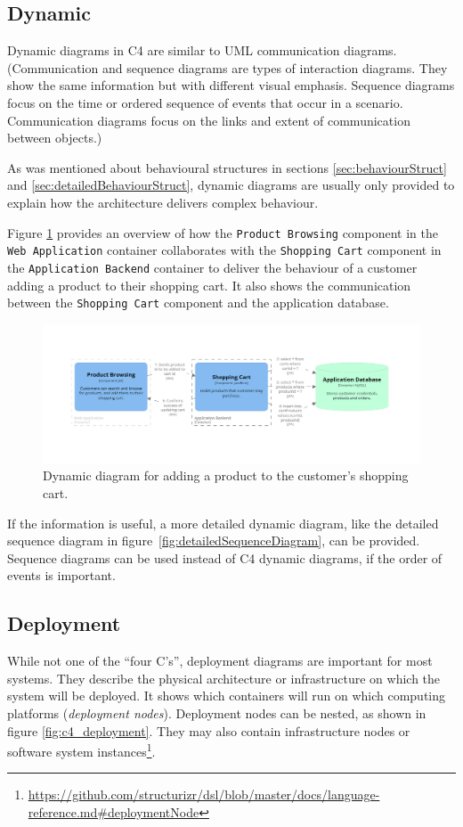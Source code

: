 \subsection{Dynamic}
Dynamic diagrams in C4 are similar to UML communication diagrams.
(Communication and sequence diagrams are types of interaction diagrams.
They show the same information but with different visual emphasis.
Sequence diagrams focus on the time or ordered sequence of events that occur in a scenario.
Communication diagrams focus on the links and extent of communication between objects.)

As was mentioned about behavioural structures in sections \ref{sec:behaviourStruct} and \ref{sec:detailedBehaviourStruct},
dynamic diagrams are usually only provided to explain how the architecture delivers complex behaviour.

Figure \ref{fig:c4_dynamic} provides an overview of how the
\texttt{Product Browsing} component in the \texttt{Web Application} container collaborates with the
\texttt{Shopping Cart} component in the \texttt{Application Backend} container
to deliver the behaviour of a customer adding a product to their shopping cart.
It also shows the communication between the \texttt{Shopping Cart} component and the application database.

\begin{figure}[h!]
    \centering
    \includegraphics[trim=175 225 197 185,clip,width=\textwidth]{images/c4/add_to_cart_dynamic_diagram.png}
    \caption{Dynamic diagram for adding a product to the customer's shopping cart.}
    \label{fig:c4_dynamic}
\end{figure}

\noindent
If the information is useful, a more detailed dynamic diagram, like the detailed sequence diagram in figure~\ref{fig:detailedSequenceDiagram}, can be provided.
Sequence diagrams can be used instead of C4 dynamic diagrams, if the order of events is important.

\subsection{Deployment}\label{sec:c4_deployment}
While not one of the ``four C's'', deployment diagrams are important for most systems.
They describe the physical architecture or infrastructure on which the system will be deployed.
It shows which containers will run on which computing platforms (\emph{deployment nodes}).
Deployment nodes can be nested, as shown in figure \ref{fig:c4_deployment}.
They may also contain infrastructure nodes or software system instances\footnote{\url{https://github.com/structurizr/dsl/blob/master/docs/language-reference.md\#deploymentNode}}.

